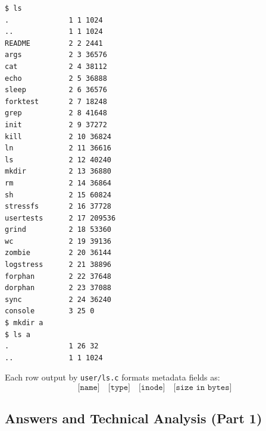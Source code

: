 \documentclass[12pt,a4paper]{article}
\begin{document}
\begin{lstlisting}[style=consolestyle]
$ ls
.              1 1 1024
..             1 1 1024
README         2 2 2441
args           2 3 36576
cat            2 4 38112
echo           2 5 36888
sleep          2 6 36576
forktest       2 7 18248
grep           2 8 41648
init           2 9 37272
kill           2 10 36824
ln             2 11 36616
ls             2 12 40240
mkdir          2 13 36880
rm             2 14 36864
sh             2 15 60824
stressfs       2 16 37728
usertests      2 17 209536
grind          2 18 53360
wc             2 19 39136
zombie         2 20 36144
logstress      2 21 38896
forphan        2 22 37648
dorphan        2 23 37088
sync           2 24 36240
console        3 25 0
$ mkdir a
$ ls a
.              1 26 32
..             1 1 1024
\end{lstlisting}

Each row output by \texttt{user/ls.c} formats metadata fields as:
\[
\texttt{[name]} \quad \texttt{[type]} \quad \texttt{[inode]} \quad \texttt{[size in bytes]}
\]

\subsection{Answers and Technical Analysis (Part 1)}
\end{document}

